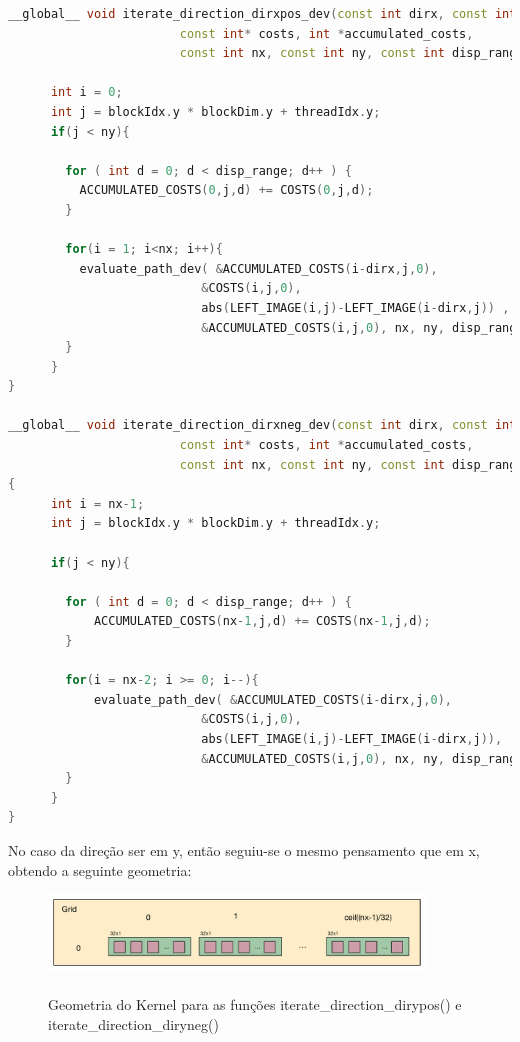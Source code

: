 \documentclass[pdftex,12pt,a4paper]{report}
\begin{document}
\begin{lstlisting}[language=c++, basicstyle=\scriptsize]
__global__ void iterate_direction_dirxpos_dev(const int dirx, const int *left_image,
                        const int* costs, int *accumulated_costs,
                        const int nx, const int ny, const int disp_range ){

      int i = 0;
      int j = blockIdx.y * blockDim.y + threadIdx.y;
      if(j < ny){

        for ( int d = 0; d < disp_range; d++ ) {
          ACCUMULATED_COSTS(0,j,d) += COSTS(0,j,d);
        }

        for(i = 1; i<nx; i++){
          evaluate_path_dev( &ACCUMULATED_COSTS(i-dirx,j,0),
                           &COSTS(i,j,0),
                           abs(LEFT_IMAGE(i,j)-LEFT_IMAGE(i-dirx,j)) ,
                           &ACCUMULATED_COSTS(i,j,0), nx, ny, disp_range);
        }
      }
}

__global__ void iterate_direction_dirxneg_dev(const int dirx, const int *left_image,
                        const int* costs, int *accumulated_costs,
                        const int nx, const int ny, const int disp_range )
{
      int i = nx-1;
      int j = blockIdx.y * blockDim.y + threadIdx.y;

      if(j < ny){

        for ( int d = 0; d < disp_range; d++ ) {
            ACCUMULATED_COSTS(nx-1,j,d) += COSTS(nx-1,j,d);
        }

        for(i = nx-2; i >= 0; i--){
            evaluate_path_dev( &ACCUMULATED_COSTS(i-dirx,j,0),
                           &COSTS(i,j,0),
                           abs(LEFT_IMAGE(i,j)-LEFT_IMAGE(i-dirx,j)),
                           &ACCUMULATED_COSTS(i,j,0), nx, ny, disp_range );
        }
      }
}
\end{lstlisting} 
\newpage
No caso da direção ser em y, então seguiu-se o mesmo pensamento que em x, obtendo a seguinte geometria:

\begin{figure}[!htb]
\center
 \includegraphics[width=100mm,scale=1]{IteratePositionDiryposneg_v1_kernel.pdf}
 \caption{\\ Geometria do Kernel para as funções iterate\_direction\_dirypos() e iterate\_direction\_diryneg()}
 \label{fig:IteratePositionDiryposneg_v1_kernel}
\end{figure}
\end{document}
